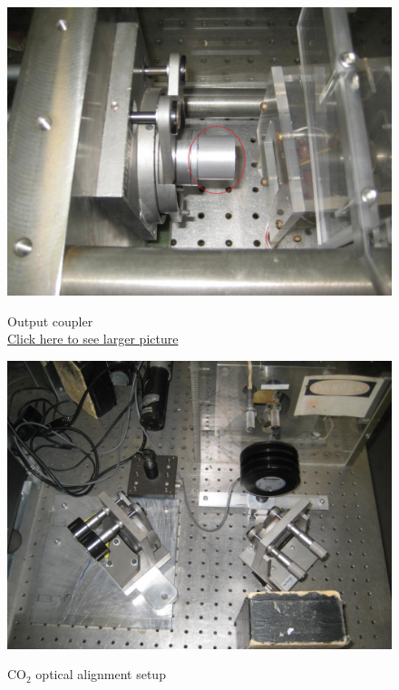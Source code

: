 \documentclass{../lab}
\begin{document}
\begin{figure}[H]
  \href{http://experimentationlab.berkeley.edu/sites/default/files/images/outputcoupler.jpg}{\includegraphics[width=\linewidth,keepaspectratio]{images/outputcoupler.jpg}}
  \caption{Output coupler\\ \href{http://experimentationlab.berkeley.edu/sites/default/files/images/outputcoupler.jpg}{Click here to see larger picture}}
  \label{fig:OutputCoupler}
\endminipage\hfill
{}
  \href{http://experimentationlab.berkeley.edu/sites/default/files/CO-2/CO2_Optics_3567_0.JPG}{\includegraphics[width=\linewidth,keepaspectratio]{images/CO2_Optics_3567_0.JPG}}
  \caption{CO$_2$ optical alignment setup \\
}
\end{figure}
\end{document}

